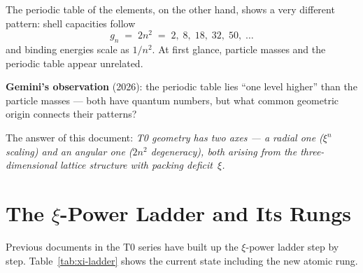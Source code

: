 The periodic table of the elements, on the other hand, shows a very different
pattern: shell capacities follow
\begin{equation}
  g_n \;=\; 2n^2 \;=\; 2,\; 8,\; 18,\; 32,\; 50,\;\ldots
  \label{eq:shells}
\end{equation}
and binding energies scale as $1/n^2$.
At first glance, particle masses and the periodic table appear unrelated.

\textbf{Gemini's observation} (2026): the periodic table lies ``one level
higher'' than the particle masses — both have quantum numbers, but what
common geometric origin connects their patterns?

The answer of this document: \emph{T0 geometry has two axes —
a radial one ($\xi^n$ scaling) and an angular one ($2n^2$ degeneracy),
both arising from the three-dimensional lattice structure with packing deficit~$\xi$.}

\section{The \texorpdfstring{$\xi$}{xi}-Power Ladder and Its Rungs}
\label{sec:xi-ladder}

Previous documents in the T0 series have built up the $\xi$-power ladder
step by step. Table~\ref{tab:xi-ladder} shows the current state including
the new atomic rung.

\begin{table}[htbp]
\centering
\caption{Complete $\xi$-power ladder (as of March 2026)}
\label{tab:xi-ladder}
\end{table}

